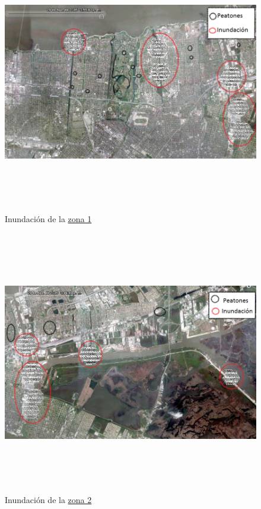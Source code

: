 \begin{figure}[H]
 \centering
 \includegraphics[height=115mm,angle=90]{figuras/cap6/resultados/katrina1.png}
 \caption{Inundación de la \hyperref[zona1]{zona 1}}
\end{figure}

\begin{figure}[H]
 \centering
 \includegraphics[height=115mm,angle=90]{figuras/cap6/resultados/katrina2.png}
 \caption{Inundación de la \hyperref[zona2]{zona 2}}
\end{figure}

